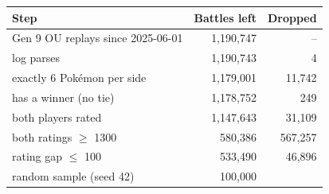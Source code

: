 \begin{tabular}{lrr}
\hline
Step & Battles left & Dropped \\
\hline
Gen 9 OU replays since 2025-06-01 & 1,190,747 & -- \\
log parses & 1,190,743 & 4 \\
exactly 6 Pok\'emon per side & 1,179,001 & 11,742 \\
has a winner (no tie) & 1,178,752 & 249 \\
both players rated & 1,147,643 & 31,109 \\
both ratings $\geq$ 1300 & 580,386 & 567,257 \\
rating gap $\leq$ 100 & 533,490 & 46,896 \\
\hline
random sample (seed 42) & 100,000 & \\
\hline
\end{tabular}
